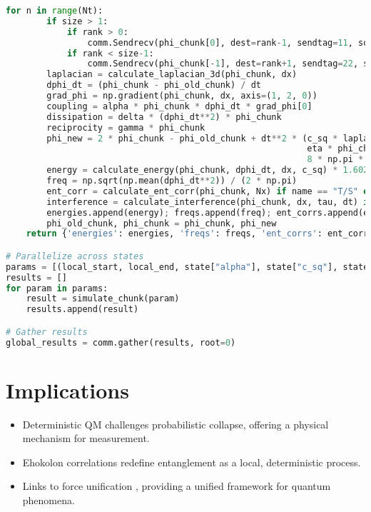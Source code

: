 \documentclass{article}
\begin{document}
\begin{lstlisting}[language=Python, caption=Ehokolon Double-Slit Simulation, label=lst:doubleslit]
    for n in range(Nt):
        if size > 1:
            if rank > 0:
                comm.Sendrecv(phi_chunk[0], dest=rank-1, sendtag=11, source=rank-1, recvtag=22)
            if rank < size-1:
                comm.Sendrecv(phi_chunk[-1], dest=rank+1, sendtag=22, source=rank+1, recvtag=11)
        laplacian = calculate_laplacian_3d(phi_chunk, dx)
        dphi_dt = (phi_chunk - phi_old_chunk) / dt
        grad_phi = np.gradient(phi_chunk, dx, axis=(1, 2, 0))
        coupling = alpha * phi_chunk * dphi_dt * grad_phi[0]
        dissipation = delta * (dphi_dt**2) * phi_chunk
        reciprocity = gamma * phi_chunk
        phi_new = 2 * phi_chunk - phi_old_chunk + dt**2 * (c_sq * laplacian - m**2 * phi_chunk - g * phi_chunk**3 - 
                                                           eta * phi_chunk**5 + coupling + dissipation + reciprocity + 
                                                           8 * np.pi * G * k * phi_chunk**2)
        energy = calculate_energy(phi_chunk, dphi_dt, dx, c_sq) * 1.602e-19
        freq = np.sqrt(np.mean(dphi_dt**2)) / (2 * np.pi)
        ent_corr = calculate_ent_corr(phi_chunk, Nx) if name == "T/S" else 0
        interference = calculate_interference(phi_chunk, dx, tau, dt) if name == "S=T" else 0
        energies.append(energy); freqs.append(freq); ent_corrs.append(ent_corr); interferences.append(interference)
        phi_old_chunk, phi_chunk = phi_chunk, phi_new
    return {'energies': energies, 'freqs': freqs, 'ent_corrs': ent_corrs, 'interferences': interferences, 'name': name}

# Parallelize across states
params = [(local_start, local_end, state["alpha"], state["c_sq"], state["name"]) for state in states]
results = []
for param in params:
    result = simulate_chunk(param)
    results.append(result)

# Gather results
global_results = comm.gather(results, root=0)
\end{lstlisting}

\section{Implications}
\begin{itemize}
    \item Deterministic QM challenges probabilistic collapse, offering a physical mechanism for measurement.
    \item Ehokolon correlations redefine entanglement as a local, deterministic process.
    \item Links to force unification \citep{emvula2025eqft}, providing a unified framework for quantum phenomena.
\end{itemize}
\end{document}
